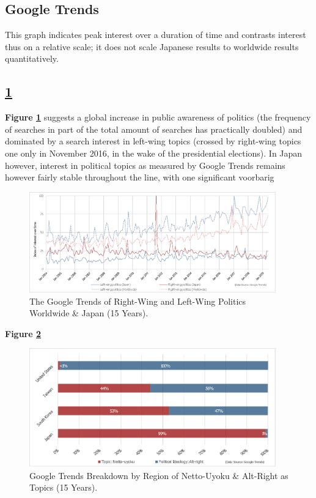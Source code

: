 \documentclass[10pt,british,A4paper,,openany]{memoir}
\begin{document}
\subsection{Google Trends}\label{google-trends}

\label{appendix:googletrends}

This graph indicates peak interest over a duration of time and contrasts
interest thus on a relative scale; it does not scale Japanese results to
worldwide results quantitatively.

\subsection{\texorpdfstring{\ref{fig:politictrends}}{}}\label{section-1}

\textbf{Figure \ref{fig:politictrends}} suggests a global increase in
public awareness of politics (the frequency of searches in part of the
total amount of searches has practically doubled) and dominated by a
search interest in left-wing topics (crossed by right-wing topics one
only in November 2016, in the wake of the presidential elections). In
Japan however, interest in political topics as measured by Google Trends
remains however fairly stable throughout the line, with one significant
voorbarig

\begin{figure}[!htb]
 \caption{\label{fig:politictrends} The Google Trends of Right-Wing and Left-Wing Politics Worldwide \& Japan (15 Years).}
 \centering 
 \includegraphics[width=0.95\textwidth,trim=4 4 4 4,clip]{images/politictrends.eps}
\end{figure}

\textbf{Figure \ref{fig:netto-altright}}

\begin{figure}[!htb]
 \caption{\label{fig:netto-altright} Google Trends Breakdown by Region of Netto-Uyoku \& Alt-Right as Topics (15 Years).}
 \centering
 \includegraphics[width=0.95\textwidth,trim=4 4 4 4,clip]{images/netto-altright.eps}
\end{figure}
\end{document}
